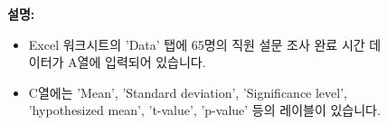 \documentclass[11pt,a4paper]{article}
\theoremstyle{definition}
\begin{document}
\begin{figure}[h!]
    \centering
    \label{fig:excel_survey_data}
    \vspace{0.5em}
    \textbf{설명:}
    \begin{itemize}
        \item Excel 워크시트의 'Data' 탭에 65명의 직원 설문 조사 완료 시간 데이터가 A열에 입력되어 있습니다.
        \item C열에는 'Mean', 'Standard deviation', 'Significance level', 'hypothesized mean', 't-value', 'p-value' 등의 레이블이 있습니다.
    \end{itemize}
\end{figure}
\end{document}
